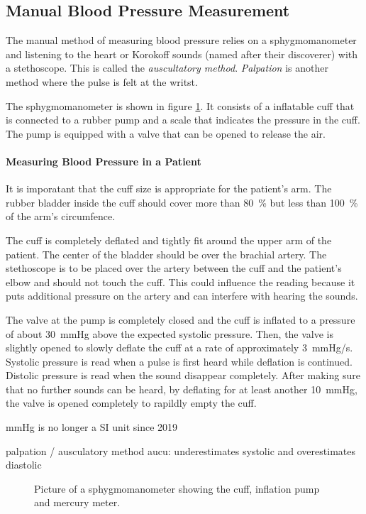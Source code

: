 \subsection{Manual Blood Pressure Measurement}
The manual method of measuring blood pressure relies on a sphygmomanometer and listening to the heart or Korokoff sounds (named after their discoverer) with a stethoscope. This is called the \emph{auscultatory method}. \emph{Palpation} is another method where the pulse is felt at the writst.

The sphygmomanometer is shown in figure \ref{fig:sphy}. It consists of a inflatable cuff that is connected to a rubber pump and a scale that indicates the pressure in the cuff. The pump is equipped with a valve that can be opened to release the air.


\paragraph{Measuring Blood Pressure in a Patient}
It is imporatant that the cuff size is appropriate for the patient's arm. The rubber bladder inside the cuff should cover more than \SI{80}{\%} but less than \SI{100}{\%} of the arm's circumfence.

The cuff is completely deflated and tightly fit around the upper arm of the patient. The center of the bladder should be over the brachial artery. The stethoscope is to be placed over the artery between the cuff and the patient's elbow and should not touch the cuff. This could influence the reading because it puts additional pressure on the artery and can interfere with hearing the sounds.\cite{NHS2019}\cite{Reeves1995}

The valve at the pump is completely closed and the cuff is inflated to a pressure of about \SI{30}{\mmHg} above the expected systolic pressure. Then, the valve is slightly opened to slowly deflate the cuff at a rate of approximately \SI{3}{\mmHg/\second}. Systolic pressure is read when a pulse is first heard while deflation is continued. Distolic pressure is read when the sound disappear completely. After making sure that no further sounds can be heard, by deflating for at least another \SI{10}{\mmHg}, the valve is opened completely to rapildly empty the cuff.   \cite{NHS2019}\cite{Reeves1995}


mmHg is no longer a SI unit since 2019

palpation / ausculatory method
aucu: underestimates systolic and overestimates diastolic

\begin{figure}
\centering
\caption{Picture of a sphygmomanometer showing the cuff, inflation pump and mercury meter.}
\label{fig:sphy}
\end{figure}


